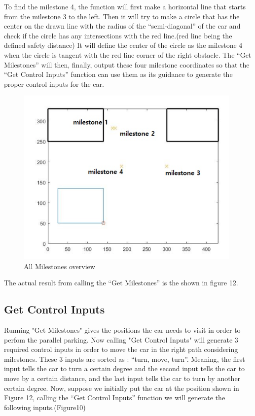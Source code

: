 \documentclass[12pt, letterpaper]{amsart} %
\numberwithin{equation}{section}
\begin{document}
To find the milestone 4, the function will first make a horizontal line that starts from the milestone 3 to the left. 
Then it will try to make a circle that has the center on the drawn line with the radius of the “semi-diagonal” of the car and check if the circle has any intersections with the red line.(red line being the defined safety distance)
It will define the center of the circle as the milestone 4 when the circle is tangent with the red line corner of the right obstacle.
The “Get Milestones” will then, finally, output these four milestone coordinates so that the “Get Control Inputs” function can use them as its guidance to generate the proper control inputs for the car.

\begin{figure}[h!]
\includegraphics[width=110mm]{fig_12.png}
\caption{All Milestones overview}
\label{fig:figure12}	
\end{figure}

The actual result from calling the “Get Milestones” is the shown in figure 12. 

\newpage

\subsection{Get Control Inputs}
Running "Get Milestones" gives the positions the car needs to visit in order to perfom the parallel parking.  
Now calling "Get Control Inputs" will generate 3 required control inputs in order to move the car in the right path considering milestones.  
These 3 inputs are sorted as :  “turn, move, turn”. Meaning, the first input tells the car to turn a certain degree and the second input tells the car to move by a certain distance, and the last input tells the car to turn by another certain degree.
\linebreak
Now, suppose we initially put the car at the position  shown in Figure 12, calling the “Get Control Inputs” function we will generate the following inputs.(Figure10)
\end{document}
